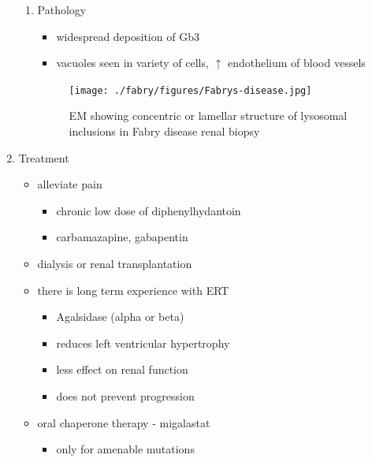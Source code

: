 \documentclass{scrartcl}
\begin{document}
\begin{enumerate}
\begin{enumerate}
\item Pathology
\label{sec:org91d8692}
\begin{itemize}
\item widespread deposition of Gb3
\item vacuoles seen in variety of cells, \(\uparrow\) endothelium of blood vessels
\end{itemize}

\begin{figure}[htbp]
\centering
\texttt{[image: ./fabry/figures/Fabrys-disease.jpg]}
\caption[Fabry EM]{\label{fig:org14dd40a}
EM showing concentric or lamellar structure of lysosomal inclusions in Fabry disease renal biopsy}
\end{figure}
\end{enumerate}

\item Treatment
\label{sec:org3f90977}
\begin{itemize}
\item alleviate pain
\begin{itemize}
\item chronic low dose of diphenylhydantoin
\item carbamazapine, gabapentin
\end{itemize}
\item dialysis or renal transplantation
\item there is long term experience with ERT
\begin{itemize}
\item Agalsidase (alpha or beta)
\item reduces left ventricular hypertrophy
\item less effect on renal function
\item does not prevent progression
\end{itemize}
\item oral chaperone therapy - migalastat
\begin{itemize}
\item only for amenable mutations
\end{itemize}
\end{itemize}
\end{enumerate}
\end{document}
